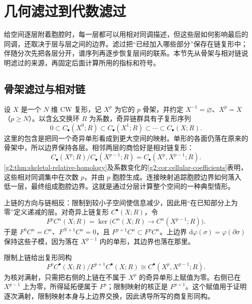 
% 
% 

\section{几何滤过到代数滤过}
\label{g2:sec:1001}

给空间逐层附着胞腔时，每一层都可以用相对同调描述，但这些层如何影响最后的同调，还取决于层与层之间的边界。滤过把“已经加入哪些部分”保存在链复形中；伴随分次先把各层分开，谱序列再逐步恢复层间的联系。本节先从骨架与相对链说明滤过的来源，再固定后面计算所用的指标和符号。

\subsection{骨架滤过与相对链}
\label{g2:subsec:1001:01}

设 \(X\) 是一个 \(N\) 维 CW 复形，记 \(X^p\) 为它的 \(p\) 骨架，并约定 \(X^{-1}=\varnothing\)、\(X^p=X\)（\(p\ge N\)）。以含幺交换环 \(R\) 为系数，奇异链群具有子复形序列
\[
	0\subset C_\bullet(X^0;R)\subset C_\bullet(X^1;R)\subset\cdots\subset C_\bullet(X;R).
\]
这里的包含是把同一个奇异单形看成到更大空间的映射。单形的各面仍落在原来的骨架中，所以边界保持各层。相邻两层的商恰好是相对链复形：
\[
	C_\bullet(X^p;R)/C_\bullet(X^{p-1};R)=C_\bullet(X^p,X^{p-1};R).
\]
\cref{g2:thm:skeletal-relative-homology}及系数变化的\cref{g2:cor:cellular-coefficients}表明，这些相对同调集中在次数 \(p\)，并由 \(p\) 胞腔生成。连接映射追踪胞腔边界如何落入低一层，最终组成胞腔边界。这就是通过分层计算整个空间的一种典型情形。

\ProseParagraphBreak

上链的方向与链相反：限制到较小子空间使信息减少，因此用“在已知部分上为零”定义递减的层。对奇异上链复形 \(C^\bullet(X;R)\)，令
\begin{equation}\label{g2:eq:skeletal-cochain-filtration}
	F^pC^n(X;R)=\ker\bigl(C^n(X;R)\longrightarrow C^n(X^{p-1};R)\bigr).
\end{equation}
于是 \(F^0C^n=C^n\)、\(F^{N+1}C^n=0\)，且 \(F^{p+1}C^n\subset F^pC^n\)。上边界 \(\mathrm d\varphi(\sigma)=\varphi(\partial\sigma)\) 保持这些子模，因为落在 \(X^{p-1}\) 内的单形，其边界也落在那里。

限制上链给出复形同构
\begin{equation}\label{g2:eq:skeletal-associated-graded}
	F^pC^\bullet(X;R)/F^{p+1}C^\bullet(X;R)
	\cong C^\bullet(X^p,X^{p-1};R).
\end{equation}
为核对满射，只需把右侧的上链在不属于 \(X^p\) 的奇异单形上赋值为零。右侧已在 \(X^{p-1}\) 上为零，所得延拓便属于 \(F^p\)；限制映射的核正是 \(F^{p+1}\)。这个赋值用于证明逐次满射，限制映射本身与上边界交换，因此诱导所写的商复形同构。

